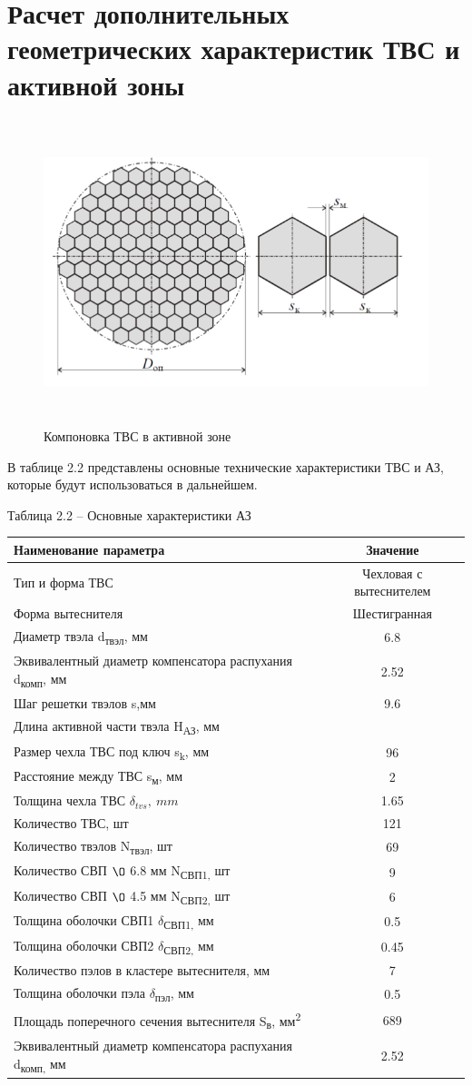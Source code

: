 \section{Расчет дополнительных геометрических характеристик ТВС и
активной зоны}

\begin{figure}[!h]
\center
\includegraphics[width=4.56942in,height=3.48958in]{media/image8.png}
\caption{Компоновка ТВС в активной зоне \cite{deev}}
\end{figure}

В таблице 2.2 представлены основные технические характеристики ТВС и АЗ,
которые будут использоваться в дальнейшем.

Таблица 2.2 -- Основные характеристики АЗ

\begin{longtable}[]{@{}|p{10cm}|c|@{}} 
\toprule
Наименование параметра & Значение\tabularnewline
\midrule
\endhead
Тип и форма ТВС & Чехловая с вытеснителем \tabularnewline
Форма вытеснителя & Шестигранная\tabularnewline
Диаметр твэла d\textsubscript{твэл}, мм & 6.8\tabularnewline
Эквивалентный диаметр компенсатора распухания d\textsubscript{комп}, мм
& 2.52\tabularnewline
Шаг решетки твэлов s,мм & 9.6\tabularnewline
Длина активной части твэла H\textsubscript{АЗ}, мм & \centering 1300\tabularnewline
Размер чехла ТВС под ключ s\textsubscript{k}, мм & 96\tabularnewline
Расстояние между ТВС s\textsubscript{м}, мм & 2\tabularnewline
Толщина чехла ТВС $\delta_{tvs},\ mm$ & 1.65\tabularnewline
Количество ТВС, шт & 121\tabularnewline
Количество твэлов N\textsubscript{твэл}, шт & 69\tabularnewline
Количество СВП $\O$ 6.8 мм N\textsubscript{СВП1,} шт & 9\tabularnewline
Количество СВП $\O$ 4.5 мм N\textsubscript{СВП2,} шт & 6\tabularnewline
Толщина оболочки СВП1 $\delta$\textsubscript{СВП1,} мм & 0.5\tabularnewline
Толщина оболочки СВП2 $\delta$\textsubscript{СВП2,} мм & 0.45\tabularnewline
Количество пэлов в кластере вытеснителя, мм & 7\tabularnewline
Толщина оболочки пэла $\delta$\textsubscript{пэл}, мм & 0.5\tabularnewline
Площадь поперечного сечения вытеснителя S\textsubscript{в},
мм\textsuperscript{2} & 689\tabularnewline
Эквивалентный диаметр компенсатора распухания d\textsubscript{комп,} мм
& 2.52\tabularnewline
\bottomrule
\end{longtable}

